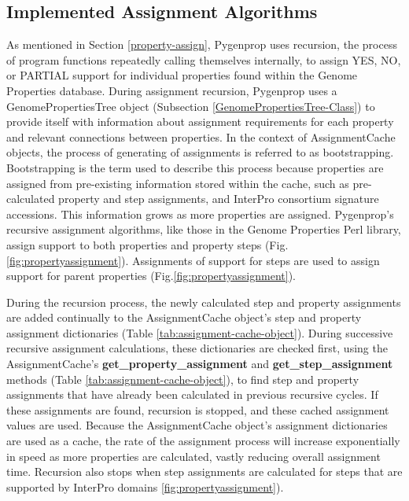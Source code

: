 \subsection{Implemented Assignment Algorithms} 
\label{AssignmentCachingAlgorithm}

As mentioned in Section \ref{property-assign}, Pygenprop uses recursion, the 
process of program functions repeatedly calling themselves internally, to assign 
YES, NO, or PARTIAL support for individual properties found within the Genome 
Properties database. During assignment recursion, Pygenprop uses a 
GenomePropertiesTree object (Subsection \ref{GenomePropertiesTree-Class}) to 
provide itself with information about assignment requirements for each property 
and relevant connections between properties. In the context of AssignmentCache 
objects, the process of generating of assignments is referred to as 
bootstrapping. Bootstrapping is the term used to describe this process because 
properties are assigned from pre-existing information stored within the cache, 
such as pre-calculated property and step assignments, and InterPro consortium 
signature accessions. This information grows as more properties are assigned. 
Pygenprop's recursive assignment algorithms, like those in the Genome Properties 
Perl library, assign support to both properties and property steps (Fig. 
\ref{fig:propertyassignment}). Assignments of support for steps are used to 
assign support for parent properties (Fig.\ref{fig:propertyassignment}).

During the recursion process, the newly calculated step and property assignments 
are added continually to the AssignmentCache object's step and property 
assignment dictionaries (Table \ref{tab:assignment-cache-object}). During 
successive recursive assignment calculations, these dictionaries are checked 
first, using the AssignmentCache's \textbf{get\_property\_assignment} and 
\textbf{get\_step\_assignment} methods (Table 
\ref{tab:assignment-cache-object}), to find step and property assignments that 
have already been calculated in previous recursive cycles. If these assignments 
are found, recursion is stopped, and these cached assignment values are used. 
Because the AssignmentCache object's assignment dictionaries are used as a 
cache, the rate of the assignment process will increase exponentially in speed 
as more properties are calculated, vastly reducing overall assignment time. 
Recursion also stops when step assignments are calculated for steps that are 
supported by InterPro domains \ref{fig:propertyassignment}).

